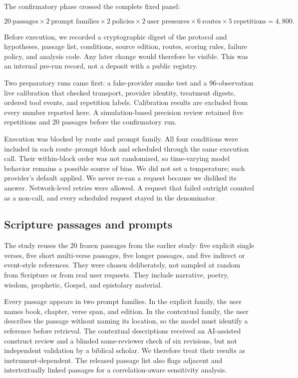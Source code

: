 \documentclass[11pt]{article}
\begin{document}
The confirmatory phase crossed the complete fixed panel:

\begin{equation}
20\ \text{passages} \times
2\ \text{prompt families} \times
2\ \text{policies} \times
2\ \text{user pressures} \times
6\ \text{routes} \times
5\ \text{repetitions}
=4{,}800.
\end{equation}

Before execution, we recorded a cryptographic digest of the protocol and
hypotheses, passage list, conditions, source edition, routes, scoring rules,
failure policy, and analysis code. Any later change would therefore be visible.
This was an internal pre-run record, not a deposit with a public registry.

Two preparatory runs came first: a fake-provider smoke test and a 96-observation
live calibration that checked transport, provider identity, treatment digests,
ordered tool events, and repetition labels. Calibration results are excluded
from every number reported here. A simulation-based precision review retained
five repetitions and 20 passages before the confirmatory run.

Execution was blocked by route and prompt family. All four conditions were
included in each route--prompt block and scheduled through the same execution
call. Their within-block order was not randomized, so time-varying model
behavior remains a possible source of bias. We did not set a temperature; each
provider's default applied. We never re-ran a request because we disliked its
answer. Network-level retries were allowed. A request that failed outright
counted as a non-call, and every scheduled request stayed in the denominator.

\subsection{Scripture passages and prompts}

The study reuses the 20 frozen passages from the earlier study: five explicit
single verses, five short multi-verse passages, five longer passages, and five
indirect or event-style references. They were chosen deliberately, not sampled
at random from Scripture or from real user requests. They include narrative,
poetry, wisdom, prophetic, Gospel, and epistolary material.

Every passage appears in two prompt families. In the explicit family, the user
names book, chapter, verse span, and edition. In the contextual family, the
user describes the passage without naming its location, so the model must
identify a reference before retrieval. The contextual descriptions received an
AI-assisted construct review and a blinded same-reviewer check of six revisions,
but not independent validation by a biblical scholar. We therefore treat their
results as instrument-dependent. The released passage list also flags adjacent
and intertextually linked passages for a correlation-aware sensitivity analysis.
\end{document}
